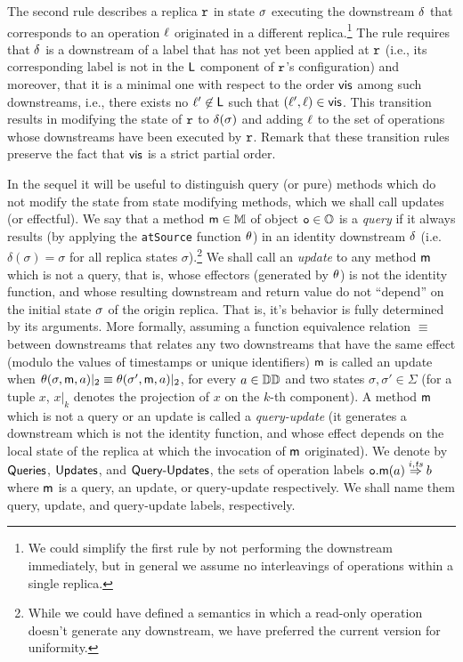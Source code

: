 The second rule describes a replica $\mathtt{r}$ in state $\sigma$
executing the downstream $\delta$ that corresponds to an operation
$\ell$ originated in a different replica.\footnote{We could
  simplify the first rule by not performing the downstream immediately,
  but in general we assume no interleavings of operations within a
  single replica.}
The rule requires that $\delta$ is a downstream of a label that has
not yet been applied at $\mathtt{r}$ (i.e., its corresponding label is not
in the $\mathsf{L}$ component of $\mathtt{r}$'s configuration) and
moreover, that it is a minimal one with respect to the order
$\mathsf{vis}$ among such downstreams, i.e., there exists no
$\ell'\not\in \mathsf{L}$ such that $(\ell',\ell)\in
\mathsf{vis}$.
This transition results in modifying the state of $\mathtt{r}$ to
$\delta(\sigma)$ and adding $\ell$ to the set of operations
whose downstreams have been executed by $\mathtt{r}$.
Remark that these transition rules preserve the fact that $\mathsf{vis}$ is
a strict partial order.

In the sequel it will be useful to distinguish query (or pure) methods
which do not modify the state from state modifying methods, which we
shall call updates (or effectful).
%
We say that a method $\mathsf{m}\in\mathbb{M}$ of object $\mathtt{o}\in \mathbb{O}$
is a \emph{query} if it always results (by applying the {\tt atSource}
function $\theta$) in an identity downstream $\delta$ (i.e.
$\delta(\sigma)=\sigma$ for all replica states
$\sigma$).\footnote{While we could have defined a semantics in which a
  read-only operation doesn't generate any downstream, we have preferred
  the current version for uniformity.}
We shall call an \emph{update} to any method $\mathsf{m}$ which is not a query,
that is, whose effectors (generated by $\theta$) is not the
identity function, and whose resulting downstream and return value do
not ``depend'' on the initial state $\sigma$ of the origin replica.
That is, it's behavior is fully determined by its arguments.
More formally, assuming a function equivalence relation $\equiv$
between downstreams that relates any two downstreams that have the same
effect (modulo the values of timestamps or unique identifiers)
$\mathsf{m}$ is called an update when
$\theta(\sigma,\mathsf{m},a)|_2 \equiv
\theta(\sigma',\mathsf{m},a)|_2$, for every $a\in\mathbb{DD}$
and two states $\sigma,\sigma'\in\Sigma$ (for a tuple $x$, $x|_k$
denotes the projection of $x$ on the $k$-th component).
A method $\mathsf{m}$ which is not a query or an update is called a
\emph{query-update} (it generates a downstream which is not the
identity function, and whose effect depends on the local state of the
replica at which the invocation of $\mathsf{m}$ originated).
We denote by $\mathsf{Queries}$, $\mathsf{Updates}$, and $\mathsf{Query\text{-}Updates}$, the sets of
operation labels ${{\mathtt{o}.\mathsf{m}}}(a) \overset{i,\mathit{ts}}{\Rightarrow} b$ where $\mathsf{m}$
is a query, an update, or query-update respectively.
We shall name them query, update, and query-update labels,
respectively.

